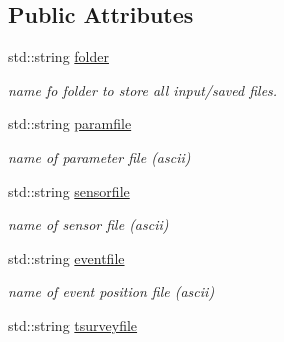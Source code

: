 \subsection*{Public Attributes}
\begin{DoxyCompactItemize}
\item 
\hypertarget{class_parameters_aaae1c65836e5cc200a71e55e1f85b6cc}{}std\+::string \hyperlink{class_parameters_aaae1c65836e5cc200a71e55e1f85b6cc}{folder}\label{class_parameters_aaae1c65836e5cc200a71e55e1f85b6cc}

\begin{DoxyCompactList}\small\item\em name fo folder to store all input/saved files. \end{DoxyCompactList}\item 
\hypertarget{class_parameters_a53e2cf472e9d687a26374cda4211ce8f}{}std\+::string \hyperlink{class_parameters_a53e2cf472e9d687a26374cda4211ce8f}{paramfile}\label{class_parameters_a53e2cf472e9d687a26374cda4211ce8f}

\begin{DoxyCompactList}\small\item\em name of parameter file (ascii) \end{DoxyCompactList}\item 
\hypertarget{class_parameters_a69c3f616da6012e882f5cc6a4ac2bc52}{}std\+::string \hyperlink{class_parameters_a69c3f616da6012e882f5cc6a4ac2bc52}{sensorfile}\label{class_parameters_a69c3f616da6012e882f5cc6a4ac2bc52}

\begin{DoxyCompactList}\small\item\em name of sensor file (ascii) \end{DoxyCompactList}\item 
\hypertarget{class_parameters_a6f54aa04f6aa0ddd72a769d6e1bf8dd9}{}std\+::string \hyperlink{class_parameters_a6f54aa04f6aa0ddd72a769d6e1bf8dd9}{eventfile}\label{class_parameters_a6f54aa04f6aa0ddd72a769d6e1bf8dd9}

\begin{DoxyCompactList}\small\item\em name of event position file (ascii) \end{DoxyCompactList}\item 
\hypertarget{class_parameters_abf0f99fc486e2502bb1c56dea7a47790}{}std\+::string \hyperlink{class_parameters_abf0f99fc486e2502bb1c56dea7a47790}{tsurveyfile}\label{class_parameters_abf0f99fc486e2502bb1c56dea7a47790}


\end{DoxyCompactItemize}
